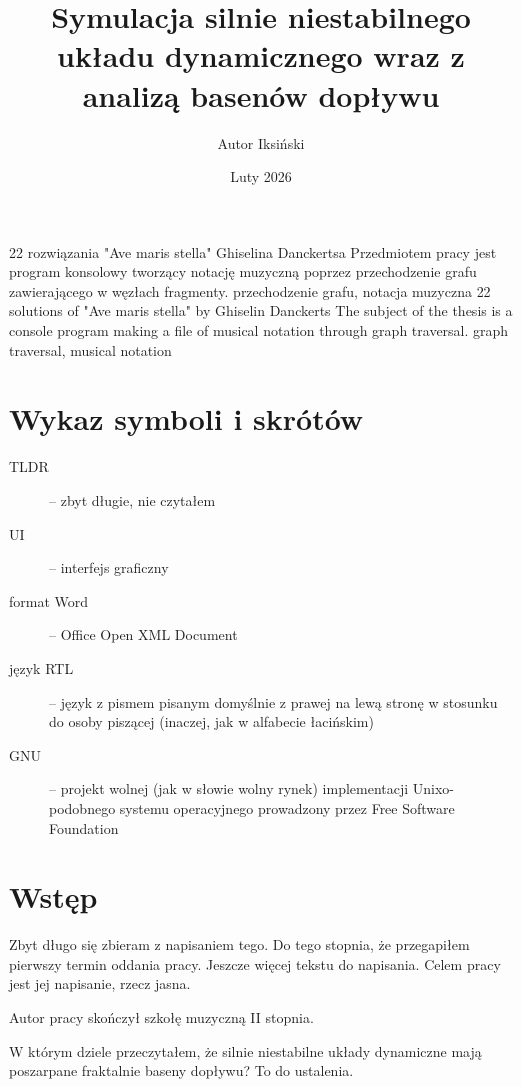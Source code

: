 \documentclass{SGGW-thesis}
\title{Symulacja silnie niestabilnego układu dynamicznego wraz z analizą basenów dopływu}
\author{Autor Iksiński}
\date{Luty 2026}
\begin{document}
\maketitle
\statementpage
\abstractpage
{22 rozwiązania "Ave maris stella" Ghiselina Danckertsa}
{Przedmiotem pracy jest program konsolowy tworzący notację muzyczną poprzez przechodzenie grafu zawierającego w węzłach fragmenty.}
{przechodzenie grafu, notacja muzyczna}
{22 solutions of "Ave maris stella" by Ghiselin Danckerts}
{The subject of the thesis is a console program making a file of musical notation through graph traversal.}
{graph traversal, musical notation}

{
  \doublespacing %
  \tableofcontents
}

\startchapterfromoddpage %

\chapter{Wykaz symboli i skrótów}
\begin{description}
  \item [TLDR] -- zbyt długie, nie czytałem
  \item [UI] -- interfejs graficzny
  \item [format Word] -- Office Open XML Document
  \item [język RTL] -- język z pismem pisanym domyślnie z prawej na lewą stronę w stosunku do osoby piszącej (inaczej, jak w alfabecie łacińskim)
  \item [GNU] -- projekt wolnej (jak w słowie wolny rynek) implementacji Unixo-podobnego systemu operacyjnego prowadzony przez Free Software Foundation
\end{description}

\chapter{Wstęp}
Zbyt długo się zbieram z napisaniem tego. Do tego stopnia, że przegapiłem pierwszy termin oddania pracy. Jeszcze więcej tekstu do napisania. Celem pracy jest jej napisanie, rzecz jasna.

Autor pracy skończył szkołę muzyczną II stopnia.

W którym dziele przeczytałem, że silnie niestabilne układy dynamiczne mają poszarpane fraktalnie baseny dopływu? To do ustalenia. 
\end{document}
